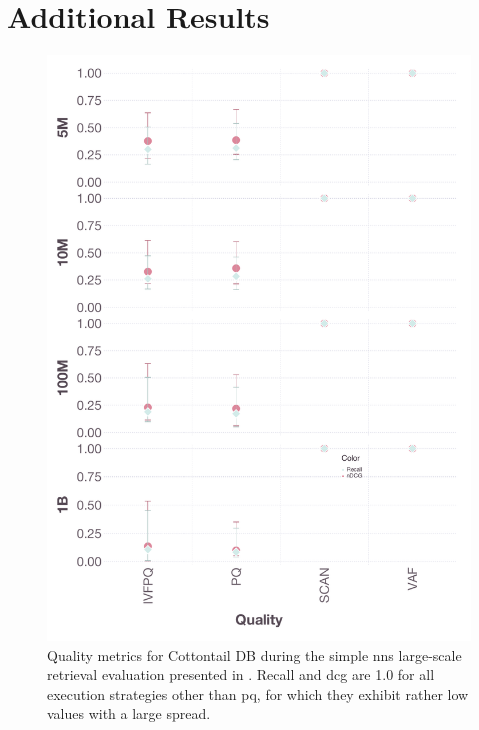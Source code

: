 \section*{Additional Results}


\begin{figure}[p]
    \includegraphics[width=\linewidth]{figures/bignns-cottontail-quality-NNS}
    \caption{Quality metrics for Cottontail DB during the simple \acrshort{nns} large-scale retrieval evaluation presented in . Recall and \acrshort{dcg} are 1.0 for all execution strategies other than \acrshort{pq}, for which they exhibit rather low values with a large spread.}
    \label{figure:appendix_bignns_cottontail_nns_quality}
\end{figure}

